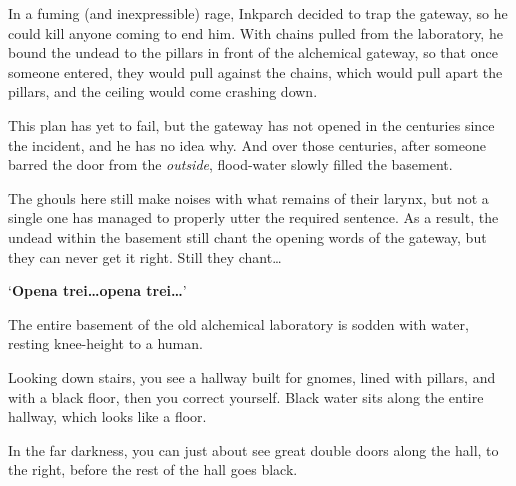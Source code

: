 \begin{exampletext}
  In a fuming (and inexpressible) rage, Inkparch decided to trap the gateway, so he could kill anyone coming to end him.
  With chains pulled from the laboratory, he bound the undead to the pillars in front of the alchemical gateway, so that once someone entered, they would pull against the chains, which would pull apart the pillars, and the ceiling would come crashing down.

  This plan has yet to fail, but the gateway has not opened in the centuries since the incident, and he has no idea why.
  And over those centuries, after someone barred the door from the \emph{outside}, flood-water slowly filled the basement.

  The ghouls here still make noises with what remains of their larynx, but not a single one has managed to properly utter the required sentence.
  As a result, the undead within the basement still chant the opening words of the gateway, but they can never get it right.
  Still they chant\ldots

  `\textbf{Opena trei\ldots opena trei\ldots}'
\end{exampletext}

The entire basement of the old alchemical laboratory is sodden with water, resting knee-height to a human.

\begin{boxtext}
  Looking down stairs, you see a hallway built for gnomes, lined with pillars, and with a black floor, then you correct yourself.
  Black water sits along the entire hallway, which looks like a floor.

  In the far darkness, you can just about see great double doors along the hall, to the right, before the rest of the hall goes black.

\end{boxtext}


